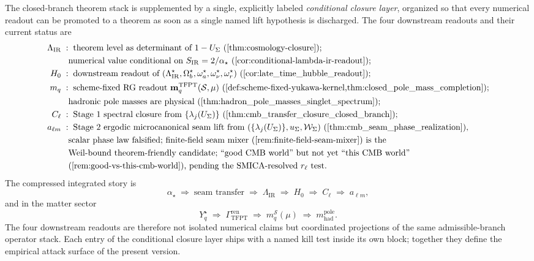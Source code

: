 The closed-branch theorem stack is supplemented by a single, explicitly labeled
\emph{conditional closure layer}, organized so that every numerical readout can be promoted to a
theorem as soon as a single named lift hypothesis is discharged. The four downstream readouts and
their current status are
\[
\begin{aligned}
\Lambda_{\mathrm{IR}}
\;&:\;\text{theorem level as determinant of $1-U_\Sigma$
(\Cref{thm:cosmology-closure})};\\
&\phantom{:}\;\text{numerical value conditional on $S_{\mathrm{IR}}=2/\alpha_\star$
(\Cref{cor:conditional-lambda-ir-readout})};\\
H_0
\;&:\;\text{downstream readout of $(\Lambda_{\mathrm{IR}}^\star,\Omega_b^\star,\omega_a^\star,
\omega_\nu^\star,\omega_r^\star)$ (\Cref{cor:late_time_hubble_readout})};\\
m_q
\;&:\;\text{scheme-fixed RG readout
$\mathbf m_q^{\mathrm{TFPT}}(\mathcal S,\mu)$
(\Cref{def:scheme-fixed-yukawa-kernel,thm:closed_pole_mass_completion})};\\
&\phantom{:}\;\text{hadronic pole masses are physical
(\Cref{thm:hadron_pole_masses_singlet_spectrum})};\\
C_\ell
\;&:\;\text{Stage 1 spectral closure from $\{\lambda_j(U_\Sigma)\}$
(\Cref{thm:cmb_transfer_closure_closed_branch})};\\
a_{\ell m}
\;&:\;\text{Stage 2 ergodic microcanonical seam lift from
$(\{\lambda_j(U_\Sigma)\},u_\Sigma,\mathcal W_\Sigma)$
(\Cref{thm:cmb_seam_phase_realization})},\\
&\phantom{:}\;\text{scalar phase law falsified; finite-field seam mixer
(\Cref{rem:finite-field-seam-mixer}) is the}\\
&\phantom{:}\;\text{Weil-bound theorem-friendly candidate;
``good CMB world'' but not yet ``this CMB world''}\\
&\phantom{:}\;\text{(\Cref{rem:good-vs-this-cmb-world}), pending the
SMICA-resolved $r_\ell$ test.}
\end{aligned}
\]
The compressed integrated story is
\[
\alpha_\star
\;\Rightarrow\;
\text{seam transfer}
\;\Rightarrow\;
\Lambda_{\mathrm{IR}}
\;\Rightarrow\;
H_0
\;\Rightarrow\;
C_\ell
\;\Rightarrow\;
a_{\ell m},
\]
and in the matter sector
\[
Y_q^\star
\;\Rightarrow\;
\Gamma_{\mathrm{TFPT}}^{\mathrm{ren}}
\;\Rightarrow\;
m_q^{\mathcal S}(\mu)
\;\Rightarrow\;
m_{\mathrm{had}}^{\mathrm{pole}}.
\]
The four downstream readouts are therefore not isolated numerical claims but coordinated projections
of the same admissible-branch operator stack. Each entry of the conditional closure layer ships with
a named kill test inside its own block; together they define the empirical attack surface of the
present version.

